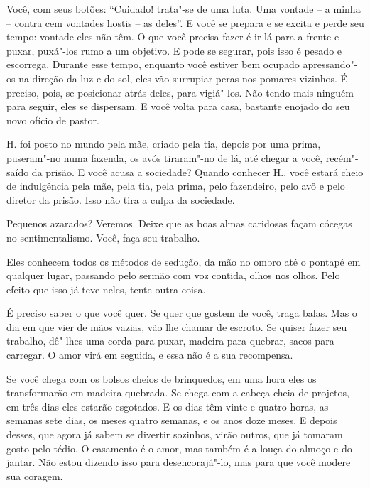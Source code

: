 \bigskip
\bigskip


Você, com seus botões: ``Cuidado! trata"-se de uma luta. Uma vontade -- a
minha -- contra cem vontades hostis -- as deles''. E você se prepara e
se excita e perde seu tempo: vontade eles não têm. O que você precisa
fazer é ir lá para a frente e puxar, puxá"-los rumo a um objetivo. E pode
se segurar, pois isso é pesado e escorrega. Durante esse tempo, enquanto
você estiver bem ocupado apressando"-os na direção da luz e do sol, eles
vão surrupiar peras nos pomares vizinhos. É preciso, pois, se posicionar
atrás deles, para vigiá"-los. Não tendo mais ninguém para seguir, eles se
dispersam. E você volta para casa, bastante enojado do seu novo ofício
de pastor.

\bigskip
\bigskip


H. foi posto no mundo pela mãe, criado pela tia, depois por uma prima,
puseram"-no numa fazenda, os avós tiraram"-no de lá, até chegar a você,
recém"-saído da prisão. E você acusa a sociedade? Quando conhecer H.,
você estará cheio de indulgência pela mãe, pela tia, pela prima, pelo
fazendeiro, pelo avô e pelo diretor da prisão. Isso não tira a culpa da
sociedade.

\bigskip
\bigskip


Pequenos azarados? Veremos. Deixe que as boas almas caridosas façam
cócegas no sentimentalismo. Você, faça seu trabalho.

\bigskip
\bigskip


Eles conhecem todos os métodos de sedução, da mão no ombro até o pontapé
em qualquer lugar, passando pelo sermão com voz contida, olhos nos
olhos. Pelo efeito que isso já teve neles, tente outra coisa.

\bigskip
\bigskip


É preciso saber o que você quer. Se quer que gostem de você, traga
balas. Mas o dia em que vier de mãos vazias, vão lhe chamar de escroto.
Se quiser fazer seu trabalho, dê"-lhes uma corda para puxar, madeira para
quebrar, sacos para carregar. O amor virá em seguida, e essa não é a sua
recompensa.

\bigskip
\bigskip


Se você chega com os bolsos cheios de brinquedos, em uma hora eles os
transformarão em madeira quebrada. Se chega com a cabeça cheia de
projetos, em três dias eles estarão esgotados. E os dias têm vinte e
quatro horas, as semanas sete dias, os meses quatro semanas, e os anos
doze meses. E depois desses, que agora já sabem se divertir sozinhos,
virão outros, que já tomaram gosto pelo tédio. O casamento é o amor, mas
também é a louça do almoço e do jantar. Não estou dizendo isso para
desencorajá"-lo, mas para que você modere sua coragem.

